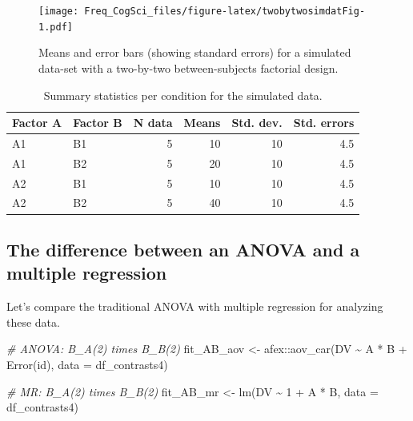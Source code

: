 \documentclass[
  12pt,
]{krantz}
\newenvironment{Shaded}{\begin{snugshade}}{\end{snugshade}}
\newcommand{\AttributeTok}[1]{\textcolor[rgb]{0.77,0.63,0.00}{#1}}
\newcommand{\CommentTok}[1]{\textcolor[rgb]{0.56,0.35,0.01}{\textit{#1}}}
\newcommand{\DecValTok}[1]{\textcolor[rgb]{0.00,0.00,0.81}{#1}}
\newcommand{\FunctionTok}[1]{\textcolor[rgb]{0.00,0.00,0.00}{#1}}
\newcommand{\NormalTok}[1]{#1}
\newcommand{\OtherTok}[1]{\textcolor[rgb]{0.56,0.35,0.01}{#1}}
\newcommand{\SpecialCharTok}[1]{\textcolor[rgb]{0.00,0.00,0.00}{#1}}
\theoremstyle{definition}
\theoremstyle{definition}
\theoremstyle{definition}
\theoremstyle{definition}
\theoremstyle{remark}
\begin{document}
\begin{figure}
\centering
\texttt{[image: Freq\_CogSci\_files/figure-latex/twobytwosimdatFig-1.pdf]}
\caption{\label{fig:twobytwosimdatFig}Means and error bars (showing standard errors) for a simulated data-set with a two-by-two between-subjects factorial design.}
\end{figure}

\begin{table}[h]

\caption{\label{tab:cTab4Means}Summary statistics per condition for the simulated data.}
\centering
\begin{tabular}[t]{llrrrr}
\toprule
Factor A & Factor B & N data & Means & Std. dev. & Std. errors\\
\midrule
A1 & B1 & 5 & 10 & 10 & 4.5\\
A1 & B2 & 5 & 20 & 10 & 4.5\\
A2 & B1 & 5 & 10 & 10 & 4.5\\
A2 & B2 & 5 & 40 & 10 & 4.5\\
\bottomrule
\end{tabular}
\end{table}

\hypertarget{the-difference-between-an-anova-and-a-multiple-regression}{%
\subsection{The difference between an ANOVA and a multiple regression}\label{the-difference-between-an-anova-and-a-multiple-regression}}

Let's compare the traditional ANOVA with multiple regression for analyzing these data.

\begin{Shaded}
\begin{Highlighting}[]
\CommentTok{\# ANOVA: B\_A(2) times B\_B(2)}
\NormalTok{fit\_AB\_aov }\OtherTok{\textless{}{-}}\NormalTok{ afex}\SpecialCharTok{::}\FunctionTok{aov\_car}\NormalTok{(DV }\SpecialCharTok{\textasciitilde{}}\NormalTok{ A }\SpecialCharTok{*}\NormalTok{ B }\SpecialCharTok{+} \FunctionTok{Error}\NormalTok{(id), }\AttributeTok{data =}\NormalTok{ df\_contrasts4)}

\CommentTok{\# MR: B\_A(2) times B\_B(2)}
\NormalTok{fit\_AB\_mr }\OtherTok{\textless{}{-}} \FunctionTok{lm}\NormalTok{(DV }\SpecialCharTok{\textasciitilde{}} \DecValTok{1} \SpecialCharTok{+}\NormalTok{ A }\SpecialCharTok{*}\NormalTok{ B, }\AttributeTok{data =}\NormalTok{ df\_contrasts4)}
\end{Highlighting}
\end{Shaded}
\end{document}
